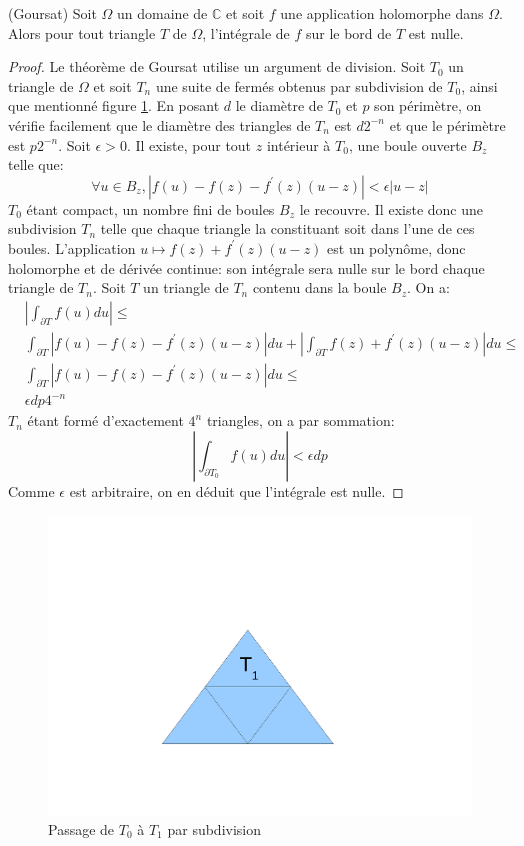 \begin{fthm}(Goursat)
Soit $\Omega$ un domaine de $\mathbb{C}$ et soit $f$ une application holomorphe
dans $\Omega$. Alors pour tout triangle $T$ de $\Omega$, l'intégrale de 
$f$ sur le bord de $T$ est nulle.
\end{fthm}

\begin{proof}
Le théorème de Goursat utilise un argument de division. Soit $T_0$ un 
triangle de $\Omega$ et soit $T_n$ une suite de fermés obtenus par
subdivision de $T_0$, ainsi que mentionné figure \ref{fig:sub_triang}. En posant
$d$ le diamètre de $T_0$ et $p$ son périmètre, on vérifie facilement que le
diamètre des triangles de $T_n$ est $d 2^{-n}$ et que le périmètre est $p
2^{-n}$. Soit $\epsilon > 0$. Il existe, pour tout $z$ intérieur à $T_0$, une
boule ouverte $B_z$ telle que:
\[
\forall u \in B_z, |f(u)-f(z)-f^\prime(z)(u-z)| < \epsilon |u-z|
\]
$T_0$ étant compact, un nombre fini de boules $B_z$ le recouvre. Il existe donc
une subdivision $T_n$ telle que chaque triangle la constituant soit dans l'une
de ces boules. L'application  $u \mapsto f(z)+f^\prime(z)(u-z)$ est un polynôme,
donc holomorphe et de dérivée continue: son intégrale sera nulle sur le
bord chaque triangle de $T_n$. Soit $T$ un triangle de $T_n$ contenu dans la boule $B_z$. 
On a:
\begin{align*}
& \left|
\int_{\partial T} f(u) du
\right| \leq  \\ &\int_{\partial T}  |f(u)-f(z)-f^\prime(z)(u-z)| du + \left |
\int_{\partial T} f(z)+f^\prime(z)(u-z) \right| du \leq \\
& \int_{\partial T}  |f(u)-f(z)-f^\prime(z)(u-z)| du \leq \\
& \epsilon d p 4^{-n}
\end{align*}
$T_n$ étant formé d'exactement $4^n$ triangles, on a par sommation:
\[
\left| \int_{\partial T_0} f(u) du \right| < \epsilon d p
\]
Comme $\epsilon$ est arbitraire, on en déduit que l'intégrale est nulle.
\end{proof}
 \begin{figure}[ht]
\includegraphics[scale=0.3]{images/subdivision_triangle.pdf}
\caption{Passage de $T_0$ à $T_1$ par subdivision}\label{fig:sub_triang}
\end{figure}
